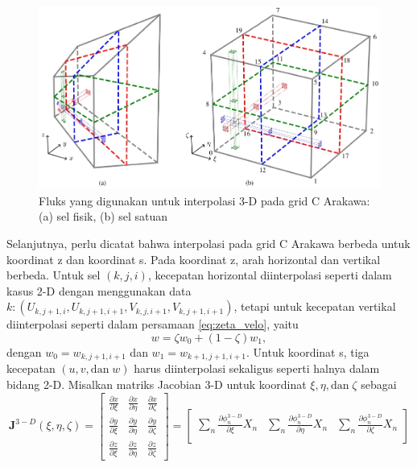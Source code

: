 \begin{spacing}{1.5}
\begin{figure}[H]
		\centering
		\includegraphics[width=13cm]{contents/mesh_arakawa3d.jpg}
		\caption{Fluks yang digunakan untuk interpolasi 3-D pada grid C Arakawa: (a) sel fisik, (b) sel satuan \protect{}}
		\label{fig:mesh3d}
	\end{figure}
	Selanjutnya, perlu dicatat bahwa interpolasi pada grid C Arakawa berbeda untuk koordinat z dan koordinat s. Pada koordinat z, arah horizontal dan vertikal berbeda. Untuk sel $(k,j,i)$, kecepatan horizontal diinterpolasi seperti dalam kasus 2-D dengan menggunakan data $k:(U_{k,j+1,i},U_{k,j+1,i+1},V_{k,j,i+1},V_{k,j+1,i+1})$, tetapi untuk kecepatan vertikal diinterpolasi seperti dalam persamaan \ref{eq:zeta_velo}, yaitu
	\begin{equation}
		w = \zeta w_0 + (1-\zeta)w_1,
	\end{equation}
	dengan $w_0=w_{k,j+1,i+1}$ dan $w_1=w_{k+1,j+1,i+1}$.
	Untuk koordinat s, tiga kecepatan $(u,v,\text{dan}\;w)$ harus diinterpolasi sekaligus seperti halnya dalam bidang 2-D. Misalkan matriks Jacobian 3-D untuk koordinat $\xi,\eta,\text{dan}\; \zeta$ sebagai
	\begin{equation*}
		\textbf{J}^{3-D}(\xi,\eta,\zeta)=
		\begin{bmatrix}
			\frac{\partial x}{\partial \xi} & \frac{\partial x}{\partial \eta} & \frac{\partial x}{\partial \zeta}\\
			\frac{\partial y}{\partial \xi} & \frac{\partial y}{\partial \eta} & \frac{\partial y}{\partial \zeta}\\
			\frac{\partial z}{\partial \xi} & \frac{\partial z}{\partial \eta} & \frac{\partial z}{\partial \zeta}
		\end{bmatrix}
		=
		\begin{bmatrix}
			\sum_n\frac{\partial \phi_n^{3-D}}{\partial \xi}X_n & \sum_n\frac{\partial \phi_n^{3-D}}{\partial \eta}X_n & \sum_n\frac{\partial \phi_n^{3-D}}{\partial \zeta}X_n\\

\end{bmatrix}
\end{equation*}
\end{spacing}
